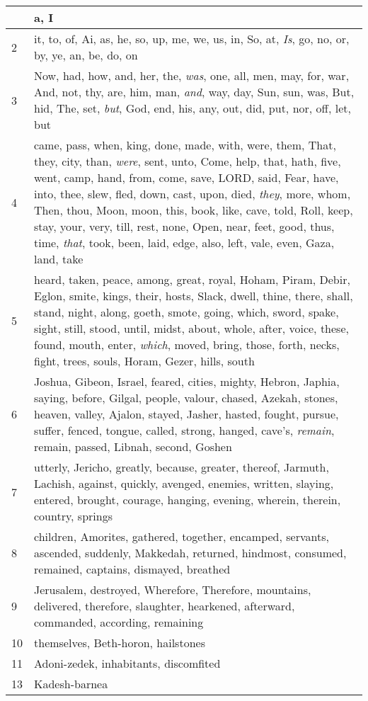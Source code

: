 \begin{longtable}{l|p{3.75in}}
\hline \hline
\endlastfoot
1 & a, I \\ \hline
2 & it, to, of, Ai, as, he, so, up, me, we, us, in, So, at, \emph{Is}, go, no, or, by, ye, an, be, do, on \\ \hline
3 & Now, had, how, and, her, the, \emph{was}, one, all, men, may, for, war, And, not, thy, are, him, man, \emph{and}, way, day, Sun, sun, was, But, hid, The, set, \emph{but}, God, end, his, any, out, did, put, nor, off, let, but \\ \hline
4 & came, pass, when, king, done, made, with, were, them, That, they, city, than, \emph{were}, sent, unto, Come, help, that, hath, five, went, camp, hand, from, come, save, LORD, said, Fear, have, into, thee, slew, fled, down, cast, upon, died, \emph{they}, more, whom, Then, thou, Moon, moon, this, book, like, cave, told, Roll, keep, stay, your, very, till, rest, none, Open, near, feet, good, thus, time, \emph{that}, took, been, laid, edge, also, left, vale, even, Gaza, land, take \\ \hline
5 & heard, taken, peace, among, great, royal, Hoham, Piram, Debir, Eglon, smite, kings, their, hosts, Slack, dwell, thine, there, shall, stand, night, along, goeth, smote, going, which, sword, spake, sight, still, stood, until, midst, about, whole, after, voice, these, found, mouth, enter, \emph{which}, moved, bring, those, forth, necks, fight, trees, souls, Horam, Gezer, hills, south \\ \hline
6 & Joshua, Gibeon, Israel, feared, cities, mighty, Hebron, Japhia, saying, before, Gilgal, people, valour, chased, Azekah, stones, heaven, valley, Ajalon, stayed, Jasher, hasted, fought, pursue, suffer, fenced, tongue, called, strong, hanged, cave's, \emph{remain}, remain, passed, Libnah, second, Goshen \\ \hline
7 & utterly, Jericho, greatly, because, greater, thereof, Jarmuth, Lachish, against, quickly, avenged, enemies, written, slaying, entered, brought, courage, hanging, evening, wherein, therein, country, springs \\ \hline
8 & children, Amorites, gathered, together, encamped, servants, ascended, suddenly, Makkedah, returned, hindmost, consumed, remained, captains, dismayed, breathed \\ \hline
9 & Jerusalem, destroyed, Wherefore, Therefore, mountains, delivered, therefore, slaughter, hearkened, afterward, commanded, according, remaining \\ \hline
10 & themselves, Beth-horon, hailstones \\ \hline
11 & Adoni-zedek, inhabitants, discomfited \\ \hline
13 & Kadesh-barnea \\ \hline
\end{longtable}






